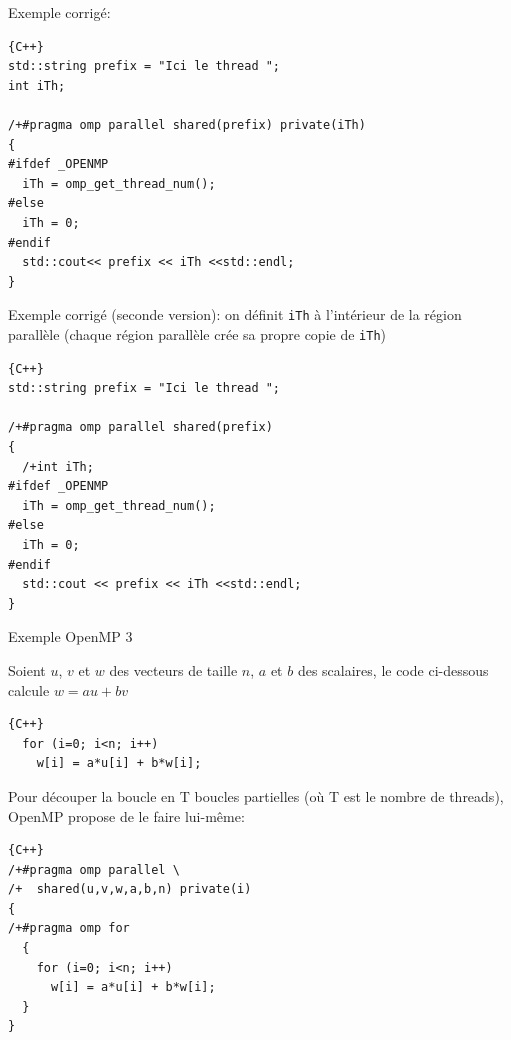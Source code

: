 \documentclass{beamer}
\begin{document}
\begin{frame}[fragile]
	Exemple corrigé:
	
\begin{lstlisting}{C++}
std::string prefix = "Ici le thread ";
int iTh;

/+#pragma omp parallel shared(prefix) private(iTh)
{
#ifdef _OPENMP
  iTh = omp_get_thread_num();
#else
  iTh = 0;
#endif
  std::cout<< prefix << iTh <<std::endl;
}
\end{lstlisting}

\end{frame}

\begin{frame}[fragile]
	Exemple corrigé (seconde version): on définit \verb|iTh| à l'intérieur de la région parallèle (chaque région parallèle crée sa propre copie de \verb|iTh|) 
	
\begin{lstlisting}{C++}
std::string prefix = "Ici le thread ";
	
/+#pragma omp parallel shared(prefix)
{
  /+int iTh;
#ifdef _OPENMP
  iTh = omp_get_thread_num();
#else
  iTh = 0;
#endif
  std::cout << prefix << iTh <<std::endl;
}
	\end{lstlisting}
	
\end{frame}

\begin{frame}[fragile]
Exemple OpenMP 3

    \vfill	
    
	Soient $u$, $v$ et $w$ des vecteurs de taille $n$, $a$ et $b$ des scalaires, le code ci-dessous calcule $w = a u + b v$

\vspace{-0.1cm}
\begin{lstlisting}{C++}
  for (i=0; i<n; i++)
    w[i] = a*u[i] + b*w[i];
\end{lstlisting}
\vfill

Pour découper la boucle en T boucles partielles (où T est le nombre de threads), OpenMP propose de le faire lui-même:


\begin{lstlisting}{C++}
/+#pragma omp parallel \
/+  shared(u,v,w,a,b,n) private(i)
{
/+#pragma omp for
  {
    for (i=0; i<n; i++)
      w[i] = a*u[i] + b*w[i];
  }
}
\end{lstlisting}

\end{frame}
\end{document}
